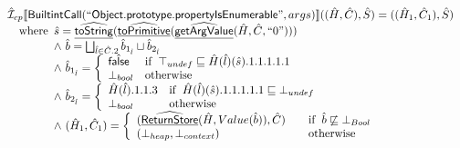 \documentclass{article}
\newcommand{\SF}[1]{\mbox{\textsf{#1}}}
\newcommand{\wherec}[1]{{\rm where}\begin{array}[t]{l}#1\end{array}}
\newcommand{\ifc}[1]{{\rm if}\begin{array}[t]{l}#1\end{array}}
\newcommand{\owc}{{\rm otherwise}}
\newcommand{\aI}{\hat{\mathcal{I}}}
\newcommand{\lbr}{\llbracket}
\newcommand{\rbr}{\rrbracket}
\newcommand{\ahf}[1]{\widehat{\underline{\sf #1}}}
\newcommand{\afalse}{\hat{\SF{false}}}
\begin{document}
\[
\begin{array}{l}
\aI _{cp}\lbr \SF{BuiltintCall}(``\SF{Object.prototype.propertyIsEnumerable}",args)\rbr((\hat{H},\hat{C}), \hat{S})
  = ((\hat{H}_1, \hat{C}_1), \hat{S})\\
\quad\wherec{
  \hat{s} = \ahf{toString}(\ahf{toPrimitive}(\ahf{getArgValue}(\hat{H}, \hat{C}, ``0")))\\
  \land\ \hat{b} = \bigsqcup_{\hat{l} \in \hat{C}.2} \hat{b}_{1_{\hat{l}}} \sqcup \hat{b}_{2_{\hat{l}}}\\
  \land\ \hat{b}_{1_{\hat{l}}} = \left\{\begin{array}{ll}
      \afalse & \ifc{\top_{undef} \sqsubseteq \hat{H}(\hat{l})(\hat{s}).1.1.1.1.1}\\
      \bot_{bool} & \owc
    \end{array}\right.\\
  \land\ \hat{b}_{2_{\hat{l}}} = \left\{\begin{array}{ll}
      \hat{H}(\hat{l}).1.1.3 & \ifc{\hat{H}(\hat{l})(\hat{s}).1.1.1.1.1 \sqsubseteq \bot_{undef}}\\
      \bot_{bool} & \owc
    \end{array}\right.\\
  \land\ (\hat{H}_1, \hat{C}_1) = 
    \left\{\begin{array}{l@{\quad\quad}l}
      (\ahf{ReturnStore}(\hat{H}, Value(\hat{b})), \hat{C})
      & \ifc{\hat{b}\not\sqsubseteq \bot_{Bool}}\\
      (\bot_{heap}, \bot_{context}) & \owc \\
    \end{array}\right.\\
  }\\
\\\\ 

\end{array}
\]
\end{document}
